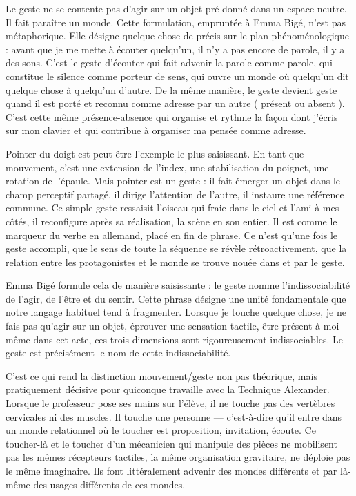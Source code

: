\documentclass[
  french,
  letterpaper,
  DIV=11,
  numbers=noendperiod]{scrreprt}
\begin{document}
Le geste ne se contente pas d'agir sur un objet pré-donné dans un espace
neutre. Il fait paraître un monde. Cette formulation, empruntée à Emma
Bigé, n'est pas métaphorique. Elle désigne quelque chose de précis sur
le plan phénoménologique : avant que je me mette à écouter quelqu'un, il
n'y a pas encore de parole, il y a des sons. C'est le geste d'écouter
qui fait advenir la parole comme parole, qui constitue le silence comme
porteur de sens, qui ouvre un monde où quelqu'un dit quelque chose à
quelqu'un d'autre. De la même manière, le geste devient geste quand il
est porté et reconnu comme adresse par un autre ( présent ou absent ).
C'est cette même présence-absence qui organise et rythme la façon dont
j'écris sur mon clavier et qui contribue à organiser ma pensée comme
adresse.~

Pointer du doigt est peut-être l'exemple le plus saisissant. En tant que
mouvement, c'est une extension de l'index, une stabilisation du poignet,
une rotation de l'épaule. Mais pointer est un geste : il fait émerger un
objet dans le champ perceptif partagé, il dirige l'attention de l'autre,
il instaure une référence commune. Ce simple geste ressaisit l'oiseau
qui fraie dans le ciel et l'ami à mes côtés, il reconfigure après sa
réalisation, la scène en son entier. Il est comme le marqueur du verbe
en allemand, placé en fin de phrase. Ce n'est qu'une fois le geste
accompli, que le sens de toute la séquence se révèle rétroactivement,
que la relation entre les protagonistes et le monde se trouve nouée dans
et par le geste.~

Emma Bigé formule cela de manière saisissante : le geste nomme
l'indissociabilité de l'agir, de l'être et du sentir. Cette phrase
désigne une unité fondamentale que notre langage habituel tend à
fragmenter. Lorsque je touche quelque chose, je ne fais pas qu'agir sur
un objet, éprouver une sensation tactile, être présent à moi-même dans
cet acte, ces trois dimensions sont rigoureusement indissociables. Le
geste est précisément le nom de cette indissociabilité.

C'est ce qui rend la distinction mouvement/geste non pas théorique, mais
pratiquement décisive pour quiconque travaille avec la Technique
Alexander. Lorsque le professeur pose ses mains sur l'élève, il ne
touche pas des vertèbres cervicales ni des muscles. Il touche une
personne --- c'est-à-dire qu'il entre dans un monde relationnel où le
toucher est proposition, invitation, écoute. Ce toucher-là et le toucher
d'un mécanicien qui manipule des pièces ne mobilisent pas les mêmes
récepteurs tactiles, la même organisation gravitaire, ne déploie pas le
même imaginaire. Ils font littéralement advenir des mondes différents et
par là-même des usages différents de ces mondes.
\end{document}
